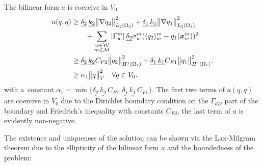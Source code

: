 The bilinear form $a$ is coercive in $V_0$
\begin{align} \label{eqn:prim_form_a_coercivity_V0}
    a(q,q) &\geq
          \underline{\delta_2}\,\underline{k_2} \bigl\Vert\nabla q_2\bigr\Vert^2_{L_2(\Omega_2)}
        + \underline{\delta_1}\,\underline{k_1} \bigl\Vert\nabla q_1\bigr\Vert^2_{L_2(\Omega_1)}\\
        & \qquad + \sum_{\substack{w\in \mathcal{W} \\ m\in \mathcal{M}}}\left|\Gamma^m_w\right| \underline{\delta_2} \sigma^m_w (\langle q_2\rangle^m_w - q_1(\mathbf{\boldsymbol{x}}^m_w))^2 \\
        &\geq
          \underline{\delta_2}\,\underline{k_2} C_{F2} \bigl\Vert q_2\bigr\Vert^2_{H^1(\Omega_2)}
        + \underline{\delta_1}\,\underline{k_1} C_{F1} \bigl\Vert q_1\bigr\Vert^2_{H^1(\Omega_1)}.\\
        &\geq
           \alpha_1\bigl\Vert q\bigr\Vert^2_V \quad \forall q\in V_0.
\end{align}
with a~constant $\alpha_1 = \min\{\underline{\delta_2}\,\underline{k_2}\, C_{F2}, \underline{\delta_1}\,\underline{k_1}\, C_{F1}\}$.
The first two terms of $a(q,q)$ are coercive in $V_0$
due to the Dirichlet boundary condition on the $\Gamma_{dD}$ part of the boundary and Friedrich's inequality with constants $C_{Fd}$,
the last term of $a$ is evidently non-negative.

The existence and uniqueness of the solution can be shown via the Lax-Milgram theorem due to the ellipticity
of the bilinear form $a$ and the boundedness of the problem:



